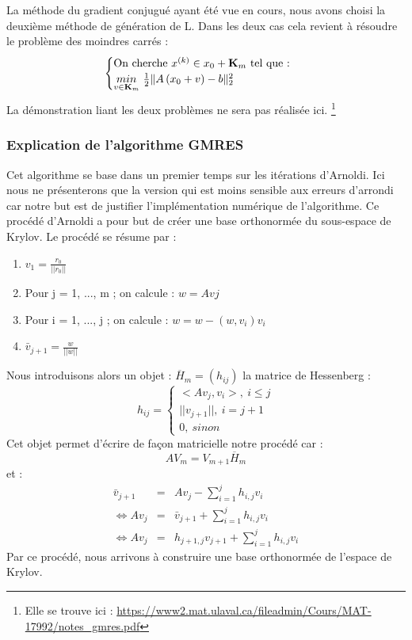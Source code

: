 La méthode du gradient conjugué ayant été vue en cours, nous avons choisi la deuxième méthode de génération de L. Dans les deux cas cela revient à résoudre le problème des moindres carrés : 
\begin{equation}
\begin{cases}
\text{On cherche $x^{(k)} \in x_0 + \mathbf{K}_m$ tel que : }\\
\underset{v \in \mathbf{K}_m}{min} \ \frac{1}{2}\|A \left(x_0 + v\right) - b\|^2_2
\end{cases}
\label{moindrecarre}
\end{equation}
La démonstration liant les deux problèmes ne sera pas réalisée ici. \footnote{Elle se trouve ici : \url{https://www2.mat.ulaval.ca/fileadmin/Cours/MAT-17992/notes_gmres.pdf}}
\subsubsection{Explication de l'algorithme GMRES}
Cet algorithme se base dans un premier temps sur les itérations d'Arnoldi. Ici nous ne présenterons que la version qui est moins sensible aux erreurs d'arrondi car notre but est de justifier l'implémentation numérique de l'algorithme. Ce procédé d'Arnoldi a pour but de créer une base orthonormée du sous-espace de Krylov. Le procédé se résume par : 
\begin{enumerate}
	\item $v_1 = \frac{r_0}{||r_0||}$
	\item Pour j = 1, ..., m ; on calcule : $w = Avj$
	\item Pour i = 1, ..., j ; on calcule : $w = w - (w, v_i) v_i$
	\item $\bar{v}_{j+1} = \frac{w}{||w||}$
\end{enumerate}

Nous introduisons alors un objet : $\overline{H}_m = (h_{ij})$ la matrice de Hessenberg : 
\begin{equation}
h_{ij} = \begin{cases}
<Av_j, v_i>, \ i\leq j \\
||v_{j+1}||, \ i = j + 1 \\
0, \ sinon
\end{cases}
\end{equation}
Cet objet permet d'écrire de façon matricielle notre procédé car  : 
\begin{equation}
AV_m = V_{m+1}\overline{H}_m
\end{equation}
et : 
\begin{eqnarray}
\bar{v}_{j+1} &=& Av_j - \sum_{i=1}^{j} h_{i,j} v_i\\
\Leftrightarrow Av_j &=& \bar{v}_{j+1} + \sum_{i=1}^{j} h_{i,j} v_i \\
\Leftrightarrow Av_j &=& h_{j+1, j}v_{j+1} + \sum_{i=1}^{j} h_{i,j} v_i
\end{eqnarray}
Par ce  procédé, nous arrivons à construire une base orthonormée de l'espace de Krylov.\\

